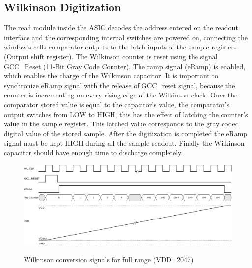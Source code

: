 \newpage
\subsection{Wilkinson Digitization}
The read module inside the ASIC decodes the address entered on the readout interface and the corresponding internal switches are powered on, connecting the window's cells comparator outputs to the latch inputs of the sample registers (Output shift register). The Wilkinson counter is reset using the signal GCC\_Reset (11-Bit Gray Code Counter). The ramp signal (eRamp) is enabled, which enables the charge of the Wilkinson capacitor. It is important to synchronize eRamp signal with the release of GCC\_reset signal, because the counter is incrementing on every rising edge of the Wilkinson clock. Once the comparator stored value is equal to the capacitor's value, the comparator's output switches from LOW to HIGH, this has the effect of latching the counter's value in the sample register. This latched value corresponds to the gray coded digital value of the stored sample. After the digitization is completed the eRamp signal must be kept HIGH during all the sample readout. Finally the Wilkinson capacitor should have enough time to discharge completely.

\begin{figure}[H]
\centering
\includegraphics[width=1\textwidth]{figures/ISELWL.png}\\
\caption{\label{fig:iselclock}Wilkinson conversion signals for full range (VDD=2047)}
\end{figure}

